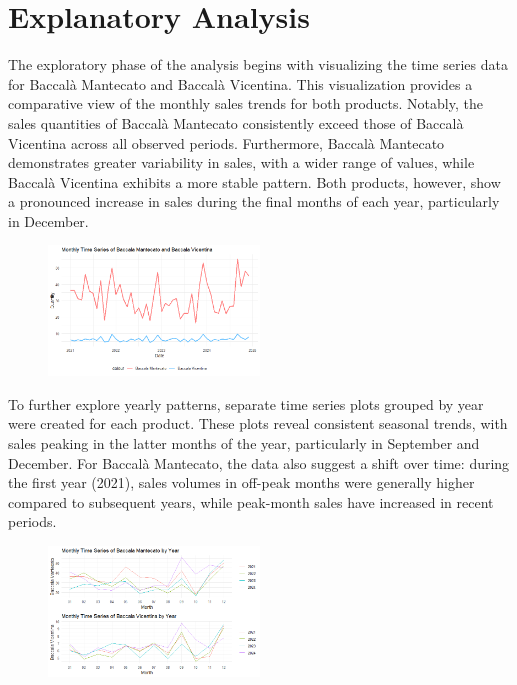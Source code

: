 \documentclass[10pt,twocolumn,letterpaper]{article}
\begin{document}
\section{Explanatory Analysis}
The exploratory phase of the analysis begins with visualizing the time series data for Baccalà Mantecato and Baccalà Vicentina. This visualization provides a comparative view of the monthly sales trends for both products. Notably, the sales quantities of Baccalà Mantecato consistently exceed those of Baccalà Vicentina across all observed periods. Furthermore, Baccalà Mantecato demonstrates greater variability in sales, with a wider range of values, while Baccalà Vicentina exhibits a more stable pattern. Both products, however, show a pronounced increase in sales during the final months of each year, particularly in December.

\begin{figure}[H]
    \centering
    \includegraphics[width=0.5\textwidth]{PlotsBEFD/SS_MAN_VIC.png} 
    \caption{}
    \label{fig:esempio}
\end{figure}

To further explore yearly patterns, separate time series plots grouped by year were created for each product. These plots reveal consistent seasonal trends, with sales peaking in the latter months of the year, particularly in September and December. For Baccalà Mantecato, the data also suggest a shift over time: during the first year (2021), sales volumes in off-peak months were generally higher compared to subsequent years, while peak-month sales have increased in recent periods.
\begin{figure}[H]
    \centering
    \includegraphics[width=0.5\textwidth]{PlotsBEFD/Month_SS_MAN_VIC.png} 
    \caption{}
    \label{fig:esempio}
\end{figure}
\end{document}
